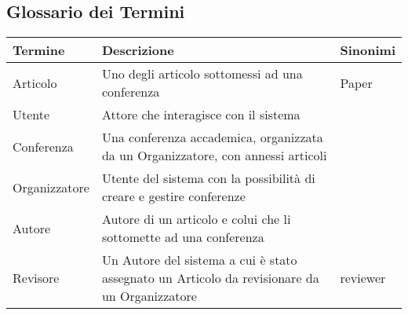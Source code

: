 \subsection{Glossario dei Termini}
\label{sec:glossario}
\begin{tabular}{|p{3cm}|p{6cm}|p{3cm}|}
  \hline
  \rowcolor{SkyBlue}
  Termine & Descrizione & Sinonimi \\
  \hline
  Articolo & Uno degli articolo sottomessi ad una conferenza & Paper \\
  \hline
  Utente & Attore che interagisce con il sistema & \\
  \hline
  Conferenza & Una conferenza accademica, organizzata da un Organizzatore, con annessi articoli & \\
  \hline
  Organizzatore & Utente del sistema con la possibilità di creare e gestire conferenze& \\
  \hline
  Autore & Autore di un articolo e colui che li sottomette ad una conferenza & \\
  \hline
  Revisore & Un Autore del sistema a cui è stato assegnato un Articolo da revisionare da un Organizzatore & reviewer\\
  \hline
\end{tabular}

